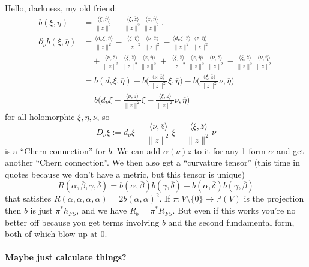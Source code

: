 \documentclass[10pt,a4paper]{amsart}
\newcommand{\kk}[1]{\mathbb{#1}}
\def\<{\langle}
\def\>{\rangle}
\def\ov#1{\overline{#1}}
\begin{document}
Hello, darkness, my old friend:
\begin{align*}
b(\xi,\ov\eta)
&= \frac{\<\xi, \ov\eta\>}{\|z\|^2}
- \frac{\<\xi, \ov z\>}{\|z\|^2}
\frac{\<z, \ov\eta\>}{\|z\|^2}.
\\
\partial_\nu b(\xi, \ov\eta)
&= \frac{\<d_\nu \xi, \ov\eta\>}{\|z\|^2}
- \frac{\<\xi, \ov\eta\>}{\|z\|^2}
\frac{\<\nu, \ov z\>}{\|z\|^2}
- \frac{\<d_\nu \xi, \ov z\>}{\|z\|^2}
\frac{\<z, \ov\eta\>}{\|z\|^2}
\\
&\quad
+
\frac{\<\nu, \ov z\>}{\|z\|^2}
\frac{\<\xi, \ov z\>}{\|z\|^2}
\frac{\<z, \ov\eta\>}{\|z\|^2}
+ \frac{\<\xi, \ov z\>}{\|z\|^2}
\frac{\<z, \ov\eta\>}{\|z\|^2}
\frac{\<\nu, \ov z\>}{\|z\|^2}
- \frac{\<\xi, \ov z\>}{\|z\|^2}
\frac{\<\nu, \ov\eta\>}{\|z\|^2}
\\
&= b(d_\nu \xi, \ov\eta)
- b\biggl(\frac{\<\nu, \ov z\>}{\|z\|^2} \xi , \ov\eta\biggr)
- b\biggl(\frac{\<\xi, \ov z\>}{\|z\|^2} \nu , \ov\eta\biggr)
\\
&= b\biggl(d_\nu \xi
- \frac{\<\nu, \ov z\>}{\|z\|^2} \xi
- \frac{\<\xi, \ov z\>}{\|z\|^2} \nu
, \ov\eta
\biggr)
\end{align*}
for all holomorphic $\xi, \eta, \nu$, so
$$
D_\nu \xi := d_\nu \xi
- \frac{\<\nu, \ov z\>}{\|z\|^2} \xi
- \frac{\<\xi, \ov z\>}{\|z\|^2} \nu
$$
is a ``Chern connection'' for $b$.
We can add $\alpha(\nu) z$ to it for any 1-form $\alpha$ and get another
``Chern connection''.
We then also get a ``curvature tensor'' (this time in quotes because we don't
have a metric, but this tensor is unique)
$$
R(\alpha,\ov\beta,\gamma,\ov\delta)
= b(\alpha,\ov\beta) b(\gamma, \ov\delta)
+ b(\alpha,\ov\delta) b(\gamma, \ov\beta)
$$
that satisfies $R(\alpha,\ov\alpha,\alpha,\ov\alpha) = 2b(\alpha,\ov\alpha)^2$.
If $\pi : V \setminus \{ 0 \} \to \kk P(V)$ is the projection then $b$ is just
$\pi^*h_{FS}$, and we have $R_b = \pi^* R_{FS}$.
But even if this works you're no better off because you get terms involving $b$
and the second fundamental form, both of which blow up at $0$.


\medskip
\paragraph{Maybe just calculate things?}
\end{document}
